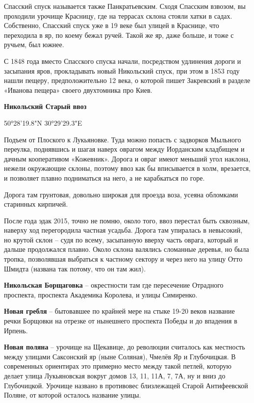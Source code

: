 Спасский спуск называется также Панкратьевским. Сходя Спасским взвозом, вы проходили урочище Красницу, где на террасах склона стояли хатки в садах. Собственно, Спасский спуск уже в 19 веке был улицей в Краснице, что переходила в яр, по коему бежал ручей. Такой же яр, даже больше, и тоже с ручьем, был южнее.

С 1848 года вместо Спасского спуска начали, посредством удлинения дороги и засыпания яров, прокладывать новый Никольский спуск, при этом в 1853 году нашли пещеру, предположительно 12 века, о которой пишет Закревский в разделе «Иванова пещера» своего двухтомника про Киев.\\


\medskip


\textbf{Никольский Старый ввоз} 

50°28'19.8"N 30°29'29.3"E

Подъем от Плоского к Лукьяновке. Туда можно попасть с задворков Мыльного переулка, поднявшись и шагая наверх оврагом между Иорданским кладбищем и дачным кооперативом «Кожевник». Дорога и овраг имеют меньший угол наклона, нежели окружающие склоны, поэтому ввоз как бы вписывается в холм, врезается, и позволяет плавно подниматься на него, а не карабкаться по горе.

Дорога там грунтовая, довольно широкая для проезда воза, усеяна обломками старинных кирпичей.

После года эдак 2015, точно не помню, около того, ввоз перестал быть сквозным, наверху ход перегородила частная усадьба. Дорога там упиралась в невысокий, но крутой склон – судя по всему, засыпанную вверху часть оврага, который и дальше продолжался плавно. Около склона валялись сломанные деревья, но была тропка, позволявшая выбраться к частному сектору и через него на улицу Отто Шмидта (названа так потому, что он там жил).\\

\medskip

\textbf{Никольская Борщаговка} – окрестности там где пересечение Отрадного проспекта, проспекта Академика Королева, и улицы Симиренко.\\

\medskip

\textbf{Новая гребля} – бытовавшее по крайней мере на стыке 19-20 веков название речки Борщовки на отрезке от нынешнего проспекта Победы и до впадения в Ирпень.\\

\medskip

\textbf{Новая поляна} – урочище на Щекавице, до революции считалось как местность между улицами Саксонский яр (ныне Соляная), Чмелёв Яр и Глубочицкая. В современных ориентирах это примерно место между такой петлей, которую делает улица Лукьяновская вокруг домов 13, 11, 11А, 7, 7А, ну и вниз до Глубочицкой. Урочище названо в противовес близлежащей Старой Антифеевской Поляне, от которой осталось название улицы.\\


